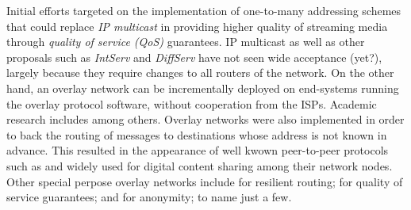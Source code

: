 \documentclass[a4paper,10pt]{article}
\begin{document}
Initial efforts targeted on the implementation of one-to-many addressing schemes that could replace \emph{IP multicast} in providing higher quality of streaming media through \emph{quality of service (QoS)} guarantees. IP multicast as well as other proposals such as \emph{IntServ} and \emph{DiffServ} \cite{cisco_diffserv_2005} have not seen wide acceptance (yet?), largely because they require changes to all routers of the network. On the other hand, an overlay network can be incrementally deployed on end-systems running the overlay protocol software, without cooperation from the ISPs. Academic research includes \cite{chu_esm_2000, jannotti_overcast_2000, kwon_tag_2002} among others.
Overlay networks were also implemented in order to back the routing of messages to destinations whose address is not known in advance. This resulted in the appearance of well kwown peer-to-peer protocols such as \cite{gnutella} and \cite{maymounkov_kademlia_2002} widely used for digital content sharing among their network nodes.
Other special perpose overlay networks include \cite{anderson_ron_2001} for resilient routing; \cite{subramanian_overqos_2004} for quality of service guarantees; and \cite{clarke_freenet_2001} for anonymity; to name just a few.
\end{document}
